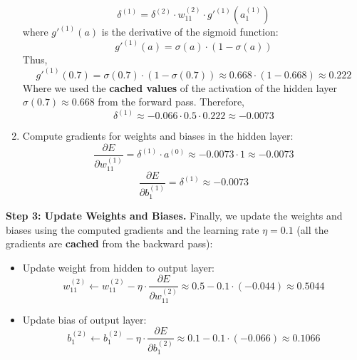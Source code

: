 \begin{examplebox}
\begin{enumerate}
        \begin{equation*}
            \delta^{(1)} = \delta^{(2)} \cdot w_{11}^{(2)} \cdot g'^{(1)}\left(a_{1}^{(1)}\right)
        \end{equation*}
        where $g'^{(1)}(a)$ is the derivative of the sigmoid function:
        \begin{equation*}
            g'^{(1)}(a) = \sigma(a) \cdot \left(1 - \sigma(a)\right)
        \end{equation*}
        Thus,
        \begin{equation*}
            g'^{(1)}(0.7) = \sigma(0.7) \cdot \left(1 - \sigma(0.7)\right) \approx 0.668 \cdot \left(1 - 0.668\right) \approx 0.222
        \end{equation*}
        Where we used the \textbf{cached values} of the activation of the hidden layer $\sigma(0.7) \approx 0.668$ from the forward pass. Therefore,
        \begin{equation*}
            \delta^{(1)} \approx -0.066 \cdot 0.5 \cdot 0.222 \approx -0.0073
        \end{equation*}
        \item Compute gradients for weights and biases in the hidden layer:
        \begin{equation*}
            \dfrac{\partial E}{\partial w_{11}^{(1)}} = \delta^{(1)} \cdot a^{(0)} \approx -0.0073 \cdot 1 \approx -0.0073
        \end{equation*}
        \begin{equation*}
            \dfrac{\partial E}{\partial b_{1}^{(1)}} = \delta^{(1)} \approx -0.0073
        \end{equation*}
    \end{enumerate}
    \textbf{Step 3: Update Weights and Biases.} Finally, we update the weights and biases using the computed gradients and the learning rate $\eta = 0.1$ (all the gradients are \textbf{cached} from the backward pass):
    \begin{itemize}
        \item Update weight from hidden to output layer:
        \begin{equation*}
            w_{11}^{(2)} \leftarrow w_{11}^{(2)} - \eta \cdot \dfrac{\partial E}{\partial w_{11}^{(2)}} \approx 0.5 - 0.1 \cdot (-0.044) \approx 0.5044
        \end{equation*}
        \item Update bias of output layer:
        \begin{equation*}
            b_{1}^{(2)} \leftarrow b_{1}^{(2)} - \eta \cdot \dfrac{\partial E}{\partial b_{1}^{(2)}} \approx 0.1 - 0.1 \cdot (-0.066) \approx 0.1066

\end{equation*}
\end{itemize}
\end{examplebox}
